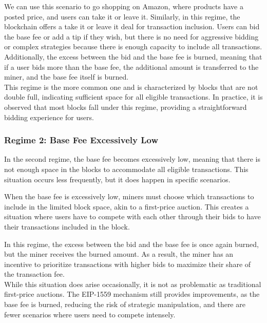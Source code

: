 We can use this scenario to go shopping on Amazon, where products have a posted price, and users can take it or leave it. Similarly, in this regime, the blockchain offers a take it or leave it deal for transaction inclusion. Users can bid the base fee or add a tip if they wish, but there is no need for aggressive bidding or complex strategies because there is enough capacity to include all transactions.\\
Additionally, the excess between the bid and the base fee is burned, meaning that if a user bids more than the base fee, the additional amount is transferred to the miner, and the base fee itself is burned.\\

This regime is the more common one and is characterized by blocks that are not double full, indicating sufficient space for all eligible transactions. In practice, it is observed that most blocks fall under this regime, providing a straightforward bidding experience for users.

\subsubsection{Regime 2: Base Fee Excessively Low}
In the second regime, the base fee becomes excessively low, meaning that there is not enough space in the blocks to accommodate all eligible transactions. This situation occurs less frequently, but it does happen in specific scenarios.

When the base fee is excessively low, miners must choose which transactions to include in the limited block space, akin to a first-price auction. This creates a situation where users have to compete with each other through their bids to have their transactions included in the block.

In this regime, the excess between the bid and the base fee is once again burned, but the miner receives the burned amount. As a result, the miner has an incentive to prioritize transactions with higher bids to maximize their share of the transaction fee.\\
While this situation does arise occasionally, it is not as problematic as traditional first-price auctions. The EIP-1559 mechanism still provides improvements, as the base fee is burned, reducing the risk of strategic manipulation, and there are fewer scenarios where users need to compete intensely.

